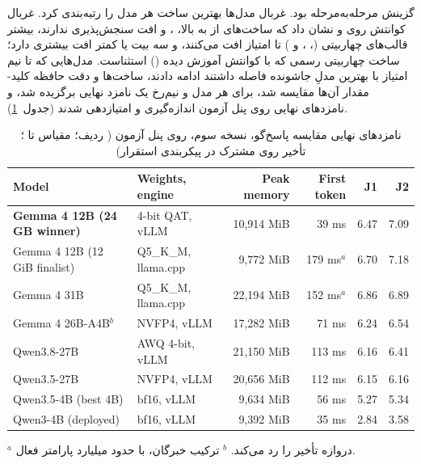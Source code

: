 گزینش مرحله‌به‌مرحله بود. غربال مدل‌ها بهترین ساخت هر مدل را رتبه‌بندی کرد. غربال
کوانتش روی  و  نشان داد که ساخت‌های  از
 به بالا، ،  و  افت سنجش‌پذیری ندارند، بیشتر
قالب‌های چهاربیتی  (، ،  و )
 تا  امتیاز افت می‌کنند، و سه بیت یا کمتر افت بیشتری دارد؛ ساخت
چهاربیتی رسمی  که با کوانتش آموزش دیده () استثناست. مدل‌هایی که تا
نیم امتیاز با بهترین مدلِ جاشونده فاصله داشتند ادامه دادند، ساخت‌ها و دقت حافظه
کلید-مقدار آن‌ها مقایسه شد، برای هر مدل و نیم‌رخ یک نامزد نهایی برگزیده شد، و نامزدهای
نهایی روی پنل آزمون اندازه‌گیری و امتیازدهی شدند (جدول~\ref{tab:resp-v3}).

\begin{table}[ht]
\centering
\caption{نامزدهای نهایی مقایسه پاسخ‌گو، نسخه سوم، روی پنل آزمون ( ردیف؛ مقیاس
          تا ؛ تأخیر روی  مشترک در پیکربندی استقرار)}
\label{tab:resp-v3}
\small
\setlength{\tabcolsep}{4pt}
\begin{latin}
\begin{tabular}{llrrrr}
\toprule
Model & Weights, engine & Peak memory & First token & J1 & J2 \\
\midrule
\textbf{Gemma 4 12B (24 GB winner)} & 4-bit QAT, vLLM & 10,914 MiB & 39 ms & 6.47 & 7.09 \\
Gemma 4 12B (12 GiB finalist) & Q5\_K\_M, llama.cpp & 9,772 MiB & 179 ms$^{a}$ & 6.70 & 7.18 \\
Gemma 4 31B & Q5\_K\_M, llama.cpp & 22,194 MiB & 152 ms$^{a}$ & 6.86 & 6.89 \\
Gemma 4 26B-A4B$^{b}$ & NVFP4, vLLM & 17,282 MiB & 71 ms & 6.24 & 6.54 \\
Qwen3.8-27B & AWQ 4-bit, vLLM & 21,150 MiB & 113 ms & 6.16 & 6.41 \\
Qwen3.5-27B & NVFP4, vLLM & 20,656 MiB & 112 ms & 6.15 & 6.16 \\
Qwen3.5-4B (best 4B) & bf16, vLLM & 9,634 MiB & 56 ms & 5.27 & 5.34 \\
Qwen3-4B (deployed) & bf16, vLLM & 9,392 MiB & 35 ms & 2.84 & 3.58 \\
\bottomrule
\end{tabular}
\end{latin}
\par\smallskip\footnotesize
$^{a}$ دروازه تأخیر را رد می‌کند.
$^{b}$ ترکیب خبرگان، با حدود  میلیارد پارامتر فعال.
\end{table}

